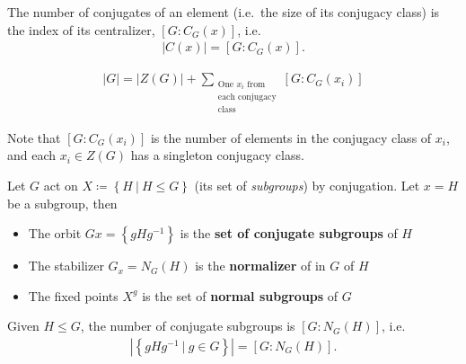 \begin{corollary}

The number of conjugates of an element (i.e.~the size of its conjugacy
class) is the index of its centralizer, \([G: C_G(x)]\), i.e.
\begin{align*}
{\left\lvert {C(x)} \right\rvert} = [G: C_G(x)]
.\end{align*}

\end{corollary}

\begin{corollary}

\begin{align*}
{\left\lvert {G} \right\rvert} = {\left\lvert {Z(G)} \right\rvert} + \sum_{\substack{\text{One $x_i$ from} \\ \text{each conjugacy} \\ \text{class}}} [G: C_G(x_i)]
\end{align*}

\end{corollary}

\begin{remark}

Note that \([G: C_G(x_i)]\) is the number of elements in the conjugacy
class of \(x_i\), and each \(x_i \in Z(G)\) has a singleton conjugacy
class.

\end{remark}

\begin{example}[?]

Let \(G\) act on
\(X \coloneqq\left\{{H {~\mathrel{\Big|}~}H\leq G}\right\}\) (its set of
\emph{subgroups}) by conjugation. Let \(x = H\) be a subgroup, then

\begin{itemize}
\item
  The orbit \(Gx = \left\{{gHg^{-1}}\right\}\) is the \textbf{set of
  conjugate subgroups} of \(H\)
\item
  The stabilizer \(G_x = N_G(H)\) is the \textbf{normalizer} of in \(G\)
  of \(H\)
\item
  The fixed points \(X^g\) is the set of \textbf{normal subgroups} of
  \(G\)
\end{itemize}

\end{example}

\begin{corollary}

Given \(H \leq G\), the number of conjugate subgroups is
\([G: N_G(H)]\), i.e.
\begin{align*}
{\left\lvert {\left\{{ gHg ^{-1} {~\mathrel{\Big|}~}g \in G }\right\} } \right\rvert} = [G: N_G(H)]
.\end{align*}

\end{corollary}

